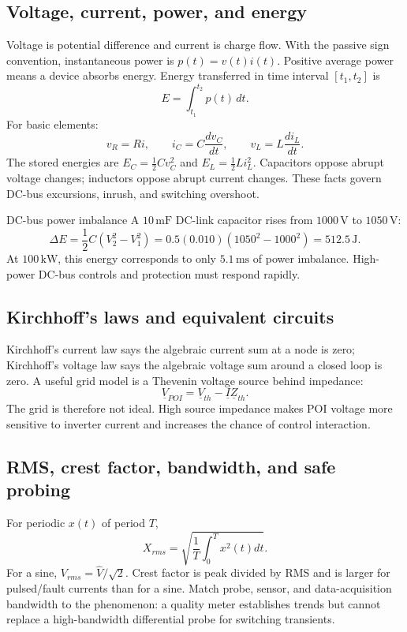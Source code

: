 \documentclass[11pt]{article}
\newcommand{\V}{\mathrm{V}}
\newcommand{\kW}{\mathrm{kW}}
\begin{document}
\subsection{Voltage, current, power, and energy}
Voltage is potential difference and current is charge flow. With the passive
sign convention, instantaneous power is $p(t)=v(t)i(t)$. Positive average
power means a device absorbs energy. Energy transferred in time interval
$[t_1,t_2]$ is
\[
E=\int_{t_1}^{t_2}p(t)\,dt.
\]
For basic elements:
\[
v_R=Ri,\qquad i_C=C\frac{dv_C}{dt},\qquad v_L=L\frac{di_L}{dt}.
\]
The stored energies are $E_C=\frac12Cv_C^2$ and $E_L=\frac12Li_L^2$.
Capacitors oppose abrupt voltage changes; inductors oppose abrupt current
changes. These facts govern DC-bus excursions, inrush, and switching overshoot.

\begin{examplebox}{DC-bus power imbalance}
A $10\,\mathrm{mF}$ DC-link capacitor rises from $1000\,\V$ to $1050\,\V$:
\[
\Delta E=\frac12C(V_2^2-V_1^2)=0.5(0.010)(1050^2-1000^2)=512.5\,\mathrm{J}.
\]
At $100\,\kW$, this energy corresponds to only $5.1\,\mathrm{ms}$ of power
imbalance. High-power DC-bus controls and protection must respond rapidly.
\end{examplebox}

\subsection{Kirchhoff's laws and equivalent circuits}
Kirchhoff's current law says the algebraic current sum at a node is zero;
Kirchhoff's voltage law says the algebraic voltage sum around a closed loop is
zero. A useful grid model is a Thevenin voltage source behind impedance:
\[
\underline V_{POI}=\underline V_{th}-\underline I\underline Z_{th}.
\]
The grid is therefore not ideal. High source impedance makes POI voltage more
sensitive to inverter current and increases the chance of control interaction.

\subsection{RMS, crest factor, bandwidth, and safe probing}
For periodic $x(t)$ of period $T$,
\[
X_{rms}=\sqrt{\frac1T\int_0^T x^2(t)dt}.
\]
For a sine, $V_{rms}=\hat V/\sqrt2$. Crest factor is peak divided by RMS and
is larger for pulsed/fault currents than for a sine. Match probe, sensor, and
data-acquisition bandwidth to the phenomenon: a quality meter establishes
trends but cannot replace a high-bandwidth differential probe for switching
transients.
\end{document}
